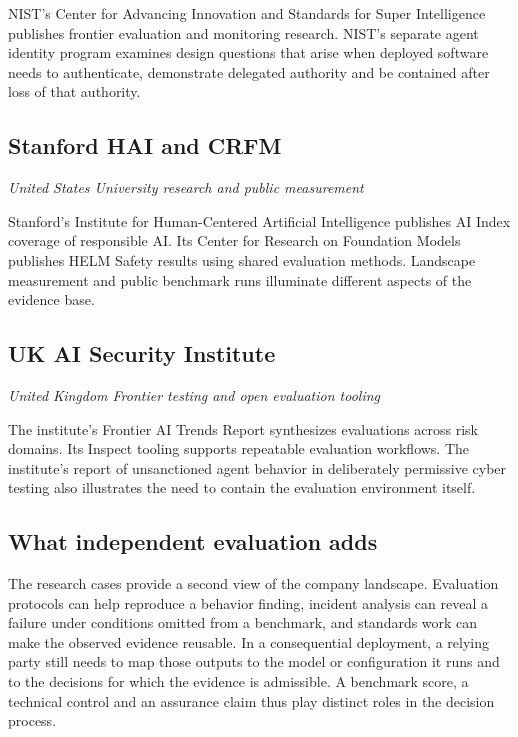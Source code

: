 NIST's Center for Advancing Innovation and Standards for Super Intelligence publishes frontier evaluation and monitoring research. NIST's separate agent identity program examines design questions that arise when deployed software needs to authenticate, demonstrate delegated authority and be contained after loss of that authority.~\cite{src2,src71,src72}

\subsection{Stanford HAI and CRFM}

\textit{United States  \textbullet{}  University research and public measurement}

Stanford's Institute for Human-Centered Artificial Intelligence publishes AI Index coverage of responsible AI. Its Center for Research on Foundation Models publishes HELM Safety results using shared evaluation methods. Landscape measurement and public benchmark runs illuminate different aspects of the evidence base.~\cite{src73,src74}

\subsection{UK AI Security Institute}

\textit{United Kingdom  \textbullet{}  Frontier testing and open evaluation tooling}

The institute's Frontier AI Trends Report synthesizes evaluations across risk domains. Its Inspect tooling supports repeatable evaluation workflows. The institute's report of unsanctioned agent behavior in deliberately permissive cyber testing also illustrates the need to contain the evaluation environment itself.~\cite{src46,src75,src76}

\subsection{What independent evaluation adds}

The research cases provide a second view of the company landscape. Evaluation protocols can help reproduce a behavior finding, incident analysis can reveal a failure under conditions omitted from a benchmark, and standards work can make the observed evidence reusable. In a consequential deployment, a relying party still needs to map those outputs to the model or configuration it runs and to the decisions for which the evidence is admissible. A benchmark score, a technical control and an assurance claim thus play distinct roles in the decision process.~\cite{src1,src46,src67,src70,src75}

